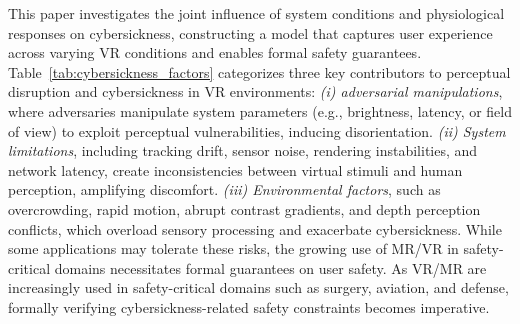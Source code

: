 \documentclass{vgtc}                          %
\newcommand{\gtan}[1]{
        \textcolor{red}{{\em\bf GT:} #1}}
\begin{document}
This paper investigates the joint influence of system conditions and physiological responses on cybersickness, constructing a model that captures user experience across varying VR conditions and enables formal safety guarantees.
%
Table~\ref{tab:cybersickness_factors} categorizes three key contributors to perceptual disruption and cybersickness in VR environments: {\em (i) adversarial manipulations}, where adversaries manipulate system parameters (e.g., brightness, latency, or field of view) to exploit perceptual vulnerabilities, inducing disorientation. {\em (ii) System limitations}, including tracking drift, sensor noise, rendering instabilities, and network latency, create inconsistencies between virtual stimuli and human perception, amplifying discomfort. {\em (iii) Environmental factors}, such as overcrowding, rapid motion, abrupt contrast gradients, and depth perception conflicts, which overload sensory processing and exacerbate cybersickness. While some applications may tolerate these risks, the growing use of MR/VR in safety-critical domains necessitates formal guarantees on user safety. As VR/MR are increasingly used in safety-critical domains such as surgery, aviation, and defense, formally verifying cybersickness-related safety constraints becomes imperative. 
\end{document}
